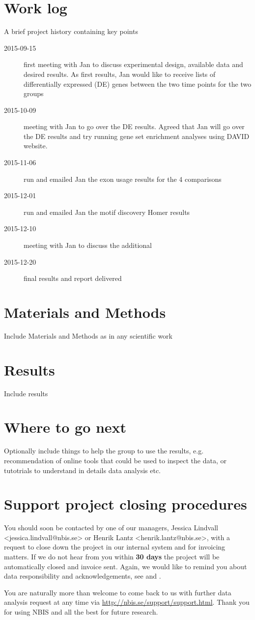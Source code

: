 \documentclass[12pt]{article}
\begin{document}
\section{Work log}
A brief project history containing key points
\begin{description}
\item[2015-09-15] first meeting with Jan to discuss experimental design, available data and desired results.	As first results, Jan would like to receive lists of differentially expressed (DE) genes between the two time points for the two groups
\item[2015-10-09] meeting with Jan to go over the DE results. Agreed that Jan will go over the DE results and try running gene set enrichment analyses using DAVID website.
\item[2015-11-06] run and emailed Jan the exon usage results for the 4 comparisons
\item[2015-12-01] run and emailed Jan the motif discovery Homer results
\item[2015-12-10] meeting with Jan to discuss the additional 
\item[2015-12-20] final results and report delivered
\end{description}


\section{Materials and Methods}
Include Materials and Methods as in any scientific work

\section{Results}
Include results

\section{Where to go next}
Optionally include things to help the group to use the results, e.g. recommendation of online tools that could be used to inspect the data, or tutotrials to understand in details data analysis etc.

\section{Support project closing procedures}
You should soon be contacted by one of our managers, Jessica Lindvall <jessica.lindvall@nbis.se> or Henrik Lantz <henrik.lantz@nbis.se>, with a request to close down the project in our internal system and for invoicing matters. If we do not hear from you within \textbf{30 days} the project will be automatically closed and invoice sent. Again, we would like to remind you about data responsibility and acknowledgements, see  and . 

You are naturally more than welcome to come back to us with further data analysis request at any time via \href{http://nbis.se/support/support.html}{http://nbis.se/support/support.html}. Thank you for using NBIS and all the best for future research. 
\end{document}
